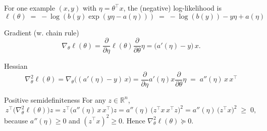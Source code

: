 \begin{answer}

For one example $(x,y)$ with $\eta=\theta^\top x$, the (negative) log-likelihood is
\[
\ell(\theta) \;=\; -\log(b(y) \exp(y\eta - a(\eta)))
    \;=\;   -\log(b(y)) - y\eta + a(\eta)
\]

Gradient (w. chain rule)
\[
\nabla_\theta \ell(\theta)
= \frac{\partial}{\partial \eta} \ell(\theta) \frac{\partial }{\partial \theta} \eta 
= \big(a'(\eta)-y\big)\,x .
\]

Hessian
\[
\nabla_\theta^2 \ell(\theta)
= \nabla_\theta \big((a'(\eta)-y)\,x\big)
= \frac{\partial}{\partial \eta} a'(\eta)x \frac{\partial }{\partial \theta} \eta 
\;=\; a''(\eta)\,x\,x^\top
\]

Positive semidefiniteness
For any $z\in\mathbb{R}^n$,
\[
z^\top \big(\nabla_\theta^2 \ell(\theta)\big) z
= z^\top \big( a''(\eta)\,x\,x^\top \big) z
= a''(\eta)\,\big(z^\top x \, x^\top z\big)^2
= a''(\eta)\,\big(z^\top x\big)^2 \;\ge\; 0,
\]
because $a''(\eta)\ge 0$ and $(z^\top x)^2\ge 0$.
Hence $\boxed{\nabla_\theta^2 \ell(\theta)\succeq 0}$.


\end{answer}
